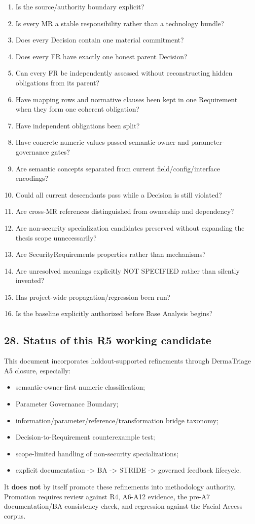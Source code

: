 \documentclass[11pt,a4paper]{article}
\providecommand{\tightlist}{\setlength{\itemsep}{0pt}\setlength{\parskip}{0pt}}
\begin{document}
\begin{enumerate}
\def\labelenumi{\arabic{enumi}.}
\tightlist
\item
  Is the source/authority boundary explicit?
\item
  Is every MR a stable responsibility rather than a technology bundle?
\item
  Does every Decision contain one material commitment?
\item
  Does every FR have exactly one honest parent Decision?
\item
  Can every FR be independently assessed without reconstructing hidden
  obligations from its parent?
\item
  Have mapping rows and normative clauses been kept in one Requirement
  when they form one coherent obligation?
\item
  Have independent obligations been split?
\item
  Have concrete numeric values passed semantic-owner and
  parameter-governance gates?
\item
  Are semantic concepts separated from current field/config/interface
  encodings?
\item
  Could all current descendants pass while a Decision is still violated?
\item
  Are cross-MR references distinguished from ownership and dependency?
\item
  Are non-security specialization candidates preserved without expanding
  the thesis scope unnecessarily?
\item
  Are SecurityRequirements properties rather than mechanisms?
\item
  Are unresolved meanings explicitly NOT SPECIFIED rather than silently
  invented?
\item
  Has project-wide propagation/regression been run?
\item
  Is the baseline explicitly authorized before Base Analysis begins?
\end{enumerate}

\subsection{28. Status of this R5 working
candidate}\label{28-status-of-this-r5-working-candidate}

This document incorporates holdout-supported refinements through
DermaTriage A5 closure, especially:

\begin{itemize}
\tightlist
\item
  semantic-owner-first numeric classification;
\item
  Parameter Governance Boundary;
\item
  information/parameter/reference/transformation bridge taxonomy;
\item
  Decision-to-Requirement counterexample test;
\item
  scope-limited handling of non-security specializations;
\item
  explicit documentation -\textgreater{} BA -\textgreater{} STRIDE
  -\textgreater{} governed feedback lifecycle.
\end{itemize}

It \textbf{does not} by itself promote these refinements into
methodology authority. Promotion requires review against R4, A6-A12
evidence, the pre-A7 documentation/BA consistency check, and regression
against the Facial Access corpus.
\end{document}
